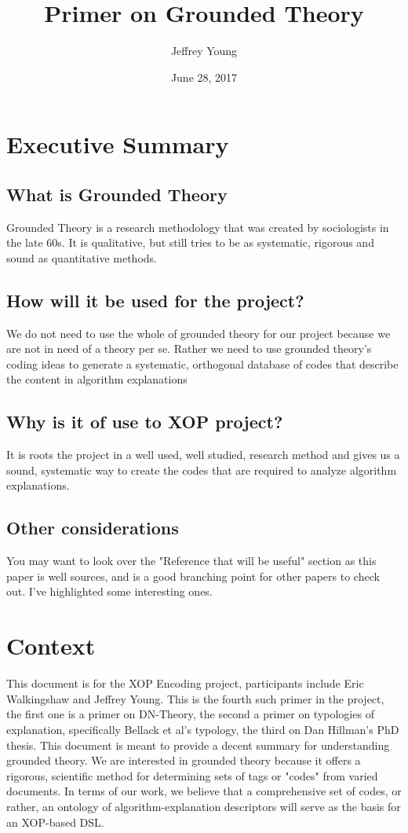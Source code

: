 \documentclass[10pt, letterpaper]{article}
\author{Jeffrey Young}
\date{June 28, 2017}
\title{Primer on Grounded Theory}
\begin{document}
\maketitle

\section*{Executive Summary}
\label{sec:org4ef6955}
\subsection*{What is Grounded Theory}
\label{sec:org3c3efab}
Grounded Theory is a research methodology that was created by sociologists in
the late 60s. It is qualitative, but still tries to be as systematic,
rigorous and sound as quantitative methods.

\subsection*{How will it be used for the project?}
\label{sec:org2b99b39}
We do not need to use the whole of grounded theory for our project because we
are not in need of a theory per se. Rather we need to use grounded theory's
coding ideas to generate a systematic, orthogonal database of codes that
describe the content in algorithm explanations

\subsection*{Why is it of use to XOP project?}
\label{sec:org088c7e0}
It is roots the project in a well used, well studied, research method and
gives us a sound, systematic way to create the codes that are required to
analyze algorithm explanations.

\subsection*{Other considerations}
\label{sec:org64a0a14}
You may want to look over the "Reference that will be useful" section as this
paper is well sources, and is a good branching point for other papers to
check out. I've highlighted some interesting ones.
\section*{Context}
\label{sec:orgad95f0e}
This document is for the XOP Encoding project, participants include Eric
Walkingshaw and Jeffrey Young. This is the fourth such primer in the project,
the first one is a primer on DN-Theory, the second a primer on typologies of
explanation, specifically Bellack et al's typology, the third on Dan Hillman's
PhD thesis. This document is meant to provide a decent summary for
understanding grounded theory. We are interested in grounded theory because it
offers a rigorous, scientific method for determining sets of tags or "codes"
from varied documents. In terms of our work, we believe that a comprehensive
set of codes, or rather, an ontology of algorithm-explanation descriptors will
serve as the basis for an XOP-based DSL.
\end{document}
